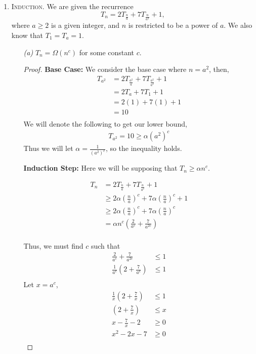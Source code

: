 \documentclass[12pt]{article}
\theoremstyle{definition}
\theoremstyle{remark}
\begin{document}
\begin{enumerate}
\newpage 
  \item \textsc{Induction.} We are given the recurrence 
  $$T_n = 2 T_{\frac{n}{a}} + 7 T_{\frac{n}{a^2}} + 1,$$
  where $a \geq 2$ is a given integer, and $n$ is restricted to be a power of $a$. We also know that $T_1 = T_a = 1$.\newline
  \begin{enumerate}
    \item[\it (a)] $T_n = \Omega(n^c)$ for some constant $c.$
\begin{proof} 
\textbf{Base Case: } We consider the base case where $n=a^2$, then, 
\begin{align*}
    T_{a^2} &= 2T_{\frac{a^2}{a}} + 7T_{\frac{a^2}{a^2}} + 1 \\
    &= 2T_{a} + 7T_{1} + 1 \\
    &= 2(1) + 7(1) + 1 \\
    &=10 \\
\end{align*}
We will denote the following to get our lower bound, 
\begin{align*}
    T_{a^2} = 10 \ge \alpha {(a^2)}^c
\end{align*}
Thus we will let $\alpha = \frac{1}{{(a^2)}^c}$, so the inequality holds. 



\textbf{Induction Step: } Here we will be supposing that $T_n \ge \alpha n^c$. 

\begin{align*}
    T_n &= 2T_{\frac{n}{a}} + 7T_{\frac{n}{a^2}} + 1 \\
    &\ge 2 \alpha {\left(\frac{n}{a} \right)}^c + 7 \alpha {\left(\frac{n}{a} \right)}^c + 1 \\
    &\ge 2 \alpha {\left(\frac{n}{a} \right)}^c + 7 \alpha {\left(\frac{n}{a} \right)}^c \\ 
    &= \alpha n^c \left(\frac{2}{a^c} + \frac{7}{a^{2c}} \right) \\
\end{align*}

Thus, we must find $c$ such that
\begin{align*}
    \frac{2}{a^c} + \frac{7}{a^{2c}} &\le 1 \\
    \frac{1}{a^c}\left(2 + \frac{7}{a^c} \right) &\le 1 \\
\end{align*}
Let $x = a^c$, 
\begin{align*}
    \frac{1}{x} \left(2 + \frac{7}{x} \right) &\le 1 \\
    \left(2 + \frac{7}{x} \right) &\le x \\
    x - \frac{7}{x} - 2 &\ge 0 \\
    x^2 - 2x -7 &\ge 0 \\
\end{align*}


\end{proof}
\end{enumerate}
\end{enumerate}
\end{document}
